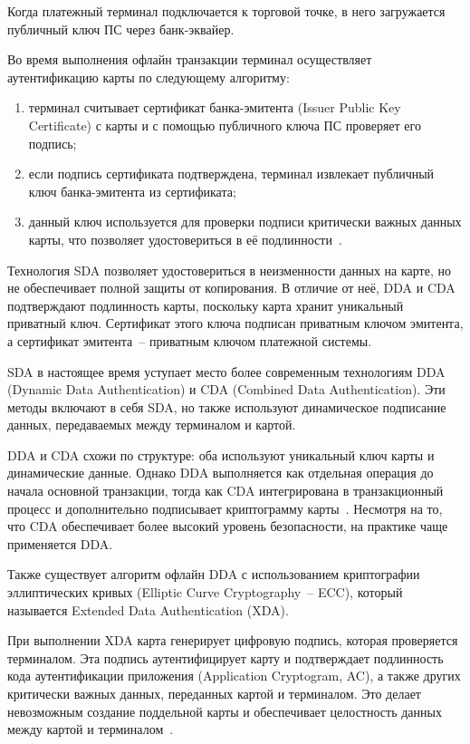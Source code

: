 Когда платежный терминал подключается к торговой точке, в него загружается публичный ключ ПС через банк-эквайер.

Во время выполнения офлайн транзакции терминал осуществляет аутентификацию карты по следующему алгоритму:

\begin{enumerate}
    \item терминал считывает сертификат банка-эмитента (Issuer Public Key Certificate) с карты и с помощью публичного ключа ПС проверяет его подпись;
    \item если подпись сертификата подтверждена, терминал извлекает публичный ключ банка-эмитента из сертификата;
    \item данный ключ используется для проверки подписи критически важных данных карты, что позволяет удостовериться в её подлинности~\cite{emv_book_2}.
\end{enumerate}

Технология SDA позволяет удостовериться в неизменности данных на карте, но не обеспечивает полной защиты от копирования.
В отличие от неё, DDA и CDA подтверждают подлинность карты, поскольку карта хранит уникальный приватный ключ.
Сертификат этого ключа подписан приватным ключом эмитента, а сертификат эмитента~-- приватным ключом платежной системы.

SDA в настоящее время уступает место более современным технологиям DDA (Dynamic Data Authentication) и CDA (Combined Data Authentication).
Эти методы включают в себя SDA, но также используют динамическое подписание данных, передаваемых между терминалом и картой.

DDA и CDA схожи по структуре: оба используют уникальный ключ карты и динамические данные.
Однако DDA выполняется как отдельная операция до начала основной транзакции, тогда как CDA интегрирована в транзакционный процесс и дополнительно подписывает криптограмму карты~\cite{emv_book_2}.
Несмотря на то, что CDA обеспечивает более высокий уровень безопасности, на практике чаще применяется DDA.

Также существует алгоритм офлайн DDA с использованием криптографии эллиптических кривых (Elliptic Curve Cryptography~-- ECC), который называется
Extended Data Authentication (XDA).

При выполнении XDA карта генерирует цифровую подпись, которая проверяется терминалом.
Эта подпись аутентифицирует карту и подтверждает подлинность кода аутентификации приложения (Application Cryptogram, AC), а также других критически важных данных, переданных картой и терминалом.
Это делает невозможным создание поддельной карты и обеспечивает целостность данных между картой и терминалом~\cite{emv_book_2}.

